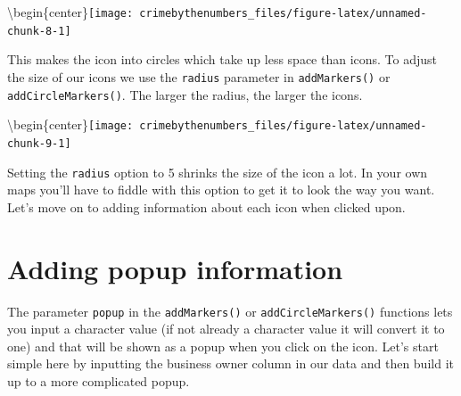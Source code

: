 \documentclass[
]{krantz}
\makeatletter
\newenvironment{Shaded}{\begin{snugshade}}{\end{snugshade}}
\newcommand{\AttributeTok}[1]{\textcolor[rgb]{0.61,0.61,0.61}{#1}}
\newcommand{\DecValTok}[1]{\textcolor[rgb]{0.06,0.06,0.06}{#1}}
\newcommand{\FunctionTok}[1]{\textcolor[rgb]{0,0,0}{#1}}
\newcommand{\NormalTok}[1]{#1}
\newcommand{\SpecialCharTok}[1]{\textcolor[rgb]{0,0,0}{#1}}
\newcommand{\StringTok}[1]{\textcolor[rgb]{0.5,0.5,0.5}{#1}}
\newenvironment{kframe}{%
\medskip{}
\setlength{\fboxsep}{.8em}
 \def\at@end@of@kframe{}%
 \ifinner\ifhmode%
  \def\at@end@of@kframe{\end{minipage}}%
  \begin{minipage}{\columnwidth}%
 \fi\fi%
 \def\FrameCommand##1{\hskip\@totalleftmargin \hskip-\fboxsep
 \colorbox{shadecolor}{##1}\hskip-\fboxsep
     \hskip-\linewidth \hskip-\@totalleftmargin \hskip\columnwidth}%
 \MakeFramed {\advance\hsize-\width
   \@totalleftmargin\z@ \linewidth\hsize
   \@setminipage}}%
 {\par\unskip\endMakeFramed%
 \at@end@of@kframe}
\renewenvironment{Shaded}{\begin{kframe}}{\end{kframe}}
\makeatother
\begin{document}
\textbackslash begin\{center\}\texttt{[image: crimebythenumbers\_files/figure-latex/unnamed-chunk-8-1]}

This makes the icon into circles which take up less space than icons. To adjust the size of our icons we use the \texttt{radius} parameter in \texttt{addMarkers()} or \texttt{addCircleMarkers()}. The larger the radius, the larger the icons.

\begin{Shaded}
\end{Shaded}

\textbackslash begin\{center\}\texttt{[image: crimebythenumbers\_files/figure-latex/unnamed-chunk-9-1]}

Setting the \texttt{radius} option to 5 shrinks the size of the icon a lot. In your own maps you'll have to fiddle with this option to get it to look the way you want. Let's move on to adding information about each icon when clicked upon.

\hypertarget{adding-popup-information}{%
\section{Adding popup information}\label{adding-popup-information}}

The parameter \texttt{popup} in the \texttt{addMarkers()} or \texttt{addCircleMarkers()} functions lets you input a character value (if not already a character value it will convert it to one) and that will be shown as a popup when you click on the icon. Let's start simple here by inputting the business owner column in our data and then build it up to a more complicated popup.
\end{document}
